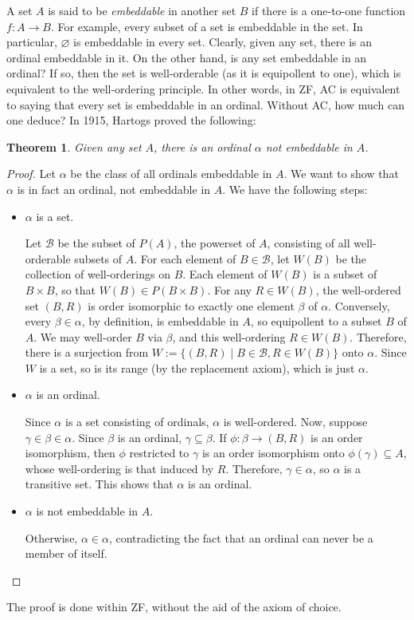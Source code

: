\documentclass[12pt]{article}
\newtheorem{thm}{Theorem}
\begin{document}
A set $A$ is said to be \emph{embeddable} in another set $B$ if there is a one-to-one function $f:A\to B$.  For example, every subset of a set is embeddable in the set.  In particular, $\varnothing$ is embeddable in every set.  Clearly, given any set, there is an ordinal embeddable in it.  On the other hand, is any set embeddable in an ordinal?  If so, then the set is well-orderable (as it is equipollent to one), which is equivalent to the well-ordering principle.  In other words, in ZF, AC is equivalent to saying that every set is embeddable in an ordinal.  Without AC, how much can one deduce?  In 1915, Hartogs proved the following:

\begin{thm} Given any set $A$, there is an ordinal $\alpha$ not embeddable in $A$. \end{thm}
\begin{proof}  Let $\alpha$ be the class of all ordinals embeddable in $A$.  We want to show that $\alpha$ is in fact an ordinal, not embeddable in $A$.  We have the following steps:
\begin{itemize}
\item $\alpha$ is a set.

Let $\mathcal{B}$ be the subset of $P(A)$, the powerset of $A$, consisting of all well-orderable subsets of $A$.  For each element of $B\in \mathcal{B}$, let $W(B)$ be the collection of well-orderings on $B$.  Each element of $W(B)$ is a subset of $B\times B$, so that $W(B)\in P(B\times B)$.  For any $R\in W(B)$, the well-ordered set $(B,R)$ is order isomorphic to exactly one element $\beta$ of $\alpha$.  Conversely, every $\beta\in \alpha$, by definition, is embeddable in $A$, so equipollent to a subset $B$ of $A$.  We may well-order $B$ via $\beta$, and this well-ordering $R\in W(B)$.  Therefore, there is a surjection from $W:=\lbrace (B,R)\mid B\in \mathcal{B}, R\in W(B)\rbrace$ onto $\alpha$.  Since $W$ is a set, so is its range (by the replacement axiom), which is just $\alpha$.
\item $\alpha$ is an ordinal.

Since $\alpha$ is a set consisting of ordinals, $\alpha$ is well-ordered.  Now, suppose $\gamma\in \beta \in \alpha$.  Since $\beta$ is an ordinal, $\gamma\subseteq \beta$.  If $\phi: \beta \to (B,R)$ is an order isomorphism, then $\phi$ restricted to $\gamma$ is an order isomorphism onto $\phi(\gamma)\subseteq A$, whose well-ordering is that induced by $R$.  Therefore, $\gamma \in \alpha$, so $\alpha$ is a transitive set.  This shows that $\alpha$ is an ordinal.
\item $\alpha$ is not embeddable in $A$.

Otherwise, $\alpha\in \alpha$, contradicting the fact that an ordinal can never be a member of itself.
\end{itemize}
\end{proof}
The proof is done within ZF, without the aid of the axiom of choice.
\end{document}
